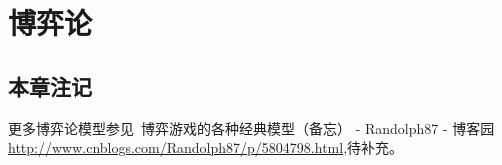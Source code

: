 \chapter{博弈论}
\minitoc



\section{本章注记}
更多博弈论模型参见~博弈游戏的各种经典模型（备忘） - Randolph87 - 博客园
 \url{http://www.cnblogs.com/Randolph87/p/5804798.html},待补充。
